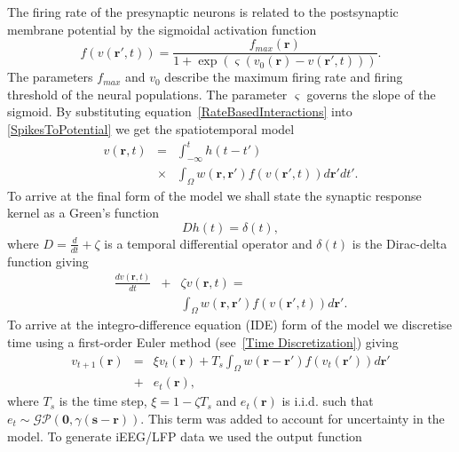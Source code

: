 \documentclass[12pt]{iopart}
\begin{document}
The firing rate of the presynaptic neurons is related to the postsynaptic membrane potential by the sigmoidal activation function 
\begin{equation}
	\label{ActivationFunction} f\left( v\left( \mathbf{r}', t \right) \right) = \frac{f_{max}\left(\mathbf{r}\right)}{1 + \exp \left( \varsigma \left( v_0\left( \mathbf{r} \right) - v\left(\mathbf{r}',t\right) \right) \right)}. 
\end{equation}
The parameters $f_{max}$ and $v_0$ describe the maximum firing rate and firing threshold of the neural populations. The parameter $\varsigma$ governs the slope of the sigmoid. By substituting equation~\ref{RateBasedInteractions} into \ref{SpikesToPotential} we get the spatiotemporal model 
\begin{eqnarray}
	\label{FullDoubleIntModel} v\left(\mathbf{r},t\right) &=&  \int_{-\infty}^t h\left(t - t'\right) \\
	&\times&\int_\Omega w\left(\mathbf{r},\mathbf{r}'\right) f\left( v\left( \mathbf{r}',t \right)\right)d\mathbf{r}'dt'. \nonumber
\end{eqnarray}
To arrive at the final form of the model we shall state the synaptic response kernel as a Green's function 
\begin{equation}
	\label{GreensFuncDef} Dh\left( t \right) = \delta \left( t \right), 
\end{equation}
where $D=\frac{d}{dt} + \zeta$ is a temporal differential operator and $\delta(t)$ is the Dirac-delta function giving 
\begin{eqnarray}
	\label{FinalFormContinuous} \frac{dv\left( \mathbf{r},t \right)}{dt} &+& \zeta v\left( \mathbf{r},t \right) = \\
	&&\int_\Omega {w\left( \mathbf{r},\mathbf{r}' \right)f\left( {v\left( \mathbf{r}',t \right)} \right)d\mathbf{r}'}. \nonumber
\end{eqnarray}
To arrive at the integro-difference equation (IDE) form of the model we discretise time using a first-order Euler method (see~\ref{Time Discretization}) giving 
\begin{eqnarray}
	\label{DiscreteTimeModel} v_{t+1}\left(\mathbf{r}\right) &=& \xi v_t\left(\mathbf{r}\right) + T_s \int_\Omega { w\left(\mathbf{r}-\mathbf{r}'\right) f\left(v_t\left(\mathbf{r}'\right)\right) d\mathbf{r}'} \nonumber\\ 
	&+& e_t\left(\mathbf{r}\right), 
\end{eqnarray}
where $T_s$ is the time step, $\xi = 1-\zeta T_s$ and $e_t(\mathbf{r})$ is i.i.d. such that $e_t\sim\mathcal{GP}(\mathbf 0,\gamma(\mathbf{s}-\mathbf{r}))$. This term was added to account for uncertainty in the model. To generate iEEG/LFP data we used the output function 
\end{document}
